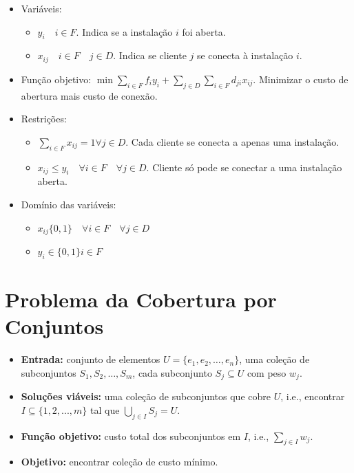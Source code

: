 \begin{itemize}
    \item Variáveis:
    \begin{itemize}
        \item $y_i \quad i \in F$. Indica se a instalação $i$ foi aberta.
        \item $x_{ij} \quad i \in F \quad j \in D$. Indica se cliente $j$ se conecta à instalação $i$.
    \end{itemize}
    \item Função objetivo: $\min\sum_{i \in F} f_iy_i + \sum_{j\in D}\sum_{i \in F} d_{ji}x_{ij}$. Minimizar o custo de abertura mais custo de conexão.
    \item Restrições:
    \begin{itemize}
        \item $\sum_{i \in F}x_{ij}=1 \forall j \in D$. Cada cliente se conecta a apenas uma instalação.
        \item $x_{ij}\leq y_i \quad \forall i \in F \quad \forall j \in D$. Cliente só pode se conectar a uma instalação aberta.
    \end{itemize}
    \item Domínio das variáveis:
    \begin{itemize}
        \item $x_{ij} \{0,1\} \quad \forall i \in F \quad \forall j \in D$
        \item $y_i \in \{0,1\} i \in F$
    \end{itemize}
\end{itemize}

\section{Problema da Cobertura por Conjuntos}

\begin{itemize}
    \item \textbf{Entrada:} conjunto de elementos $U = \{e_1,e_2,\dots,e_n\}$, uma coleção de subconjuntos $S_1,S_2,\dots,S_m$, cada subconjunto $S_j \subseteq U$ com peso $w_j$.
    \item \textbf{Soluções viáveis:} uma coleção de subconjuntos que cobre $U$, i.e., encontrar $I \subseteq \{1,2,...,m\}$ tal que $\bigcup_{j \in I} S_j = U$.
    \item \textbf{Função objetivo:} custo total dos subconjuntos em $I$, i.e., $\sum_{j \in I}w_j$.
    \item \textbf{Objetivo:} encontrar coleção de custo mínimo.
\end{itemize}

